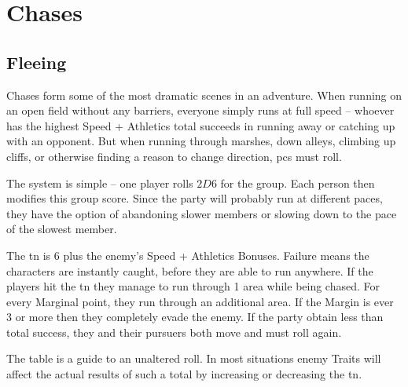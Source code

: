 \section{Chases}
\label{chases}

\begin{multicols}{2}

\subsection{Fleeing}

Chases form some of the most dramatic scenes in an adventure. When running on an open field without any barriers, everyone simply runs at full speed -- whoever has the highest Speed + Athletics total succeeds in running away or catching up with an opponent.  But when running through marshes, down alleys, climbing up cliffs, or otherwise finding a reason to change direction, \glspl{pc} must roll.

The system is simple -- one player rolls $2D6$ for the group. Each person then modifies this group score. Since the party will probably run at different paces, they have the option of abandoning slower members or slowing down to the pace of the slowest member.

The \gls{tn} is 6 plus the enemy's Speed + Athletics Bonuses. Failure means the characters are instantly caught, before they are able to run anywhere. If the players hit the \gls{tn} they manage to run through 1 area while being chased. For every Marginal point, they run through an additional area. If the Margin is ever 3 or more then they completely evade the enemy. If the party obtain less than total success, they and their pursuers both move and must roll again.

The table is a guide to an unaltered roll. In most situations enemy Traits will affect the actual results of such a total by increasing or decreasing the \gls{tn}.

\end{multicols}

